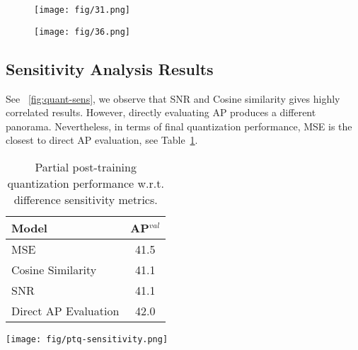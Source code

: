 \documentclass[10pt,twocolumn,letterpaper]{article}
\begin{document}
\begin{figure*}[ht]
    \centering
   \begin{subfigure}{0.45\textwidth}
   	 \texttt{[image: fig/31.png]}
	 \caption{}
    \end{subfigure}
     \begin{subfigure}{0.45\textwidth}
         \texttt{[image: fig/36.png]}
         \caption{}
     \end{subfigure}
\caption{More examples of better optimized layers in YOLOv6s that are otherwise hard to quantize.}
    \label{fig:more_repopt_act_map}
  \end{figure*}
  
\subsection{Sensitivity Analysis Results}\label{app:quant-sens}

See ~\cref{fig:quant-sens}, we observe that SNR and Cosine similarity gives highly correlated results. However, directly evaluating AP produces a different panorama. Nevertheless, in terms of final quantization performance, MSE is the closest to direct AP evaluation, see Table~\ref{tab:quant-sens-map}.

\begin{table}[ht]
\centering
  \begin{tabular}{@{}l|c@{}}
    \toprule
    Model & AP$^{val}$ \\
    \midrule
    \midrule
    MSE & 41.5\\
    Cosine Similarity & 41.1 \\
    SNR & 41.1 \\
    Direct AP Evaluation & 42.0 \\
    \bottomrule
  \end{tabular}
\caption{Partial post-training quantization performance w.r.t. difference sensitivity metrics.}
\label{tab:quant-sens-map}
\end{table}

\begin{figure*}[ht]
    \centering
    \texttt{[image: fig/ptq-sensitivity.png]}
    \caption{Quantization sensitivity analysis of all layers in YOLOv6s trained with RepOptimizer.}
    \label{fig:quant-sens}
  \end{figure*}
\end{document}
